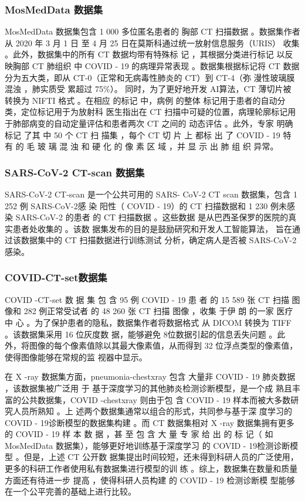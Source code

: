 \documentclass[journal,twoside,web]{ieeecolor}
\begin{document}
\subsubsection{MosMedData 数据集}
MosMedData 数据集包含 1 000 多位匿名患者的  胸部 CT 扫描数据 。数据集作者从 2020 年 3 月 1 日  至 4 月 25 日在莫斯科通过统一放射信息服务（URIS） 收集 。此外，数据集中的所有 CT 数据均带有特殊标  记 ，其根据分类进行标记 以反 映胸部 CT 肺组织 中  COVID - 19 的病理异常表现 。数据集根据标记将 CT  数据分为五大类，即从 CT-0（正常和无病毒性肺炎的  CT）到 CT-4（弥 漫性玻璃膜混浊 ，肺实质受 累超过
75\%）。 同时，为了更好地开发 AI算法，CT 薄切片被 转换为 NIFTI 格式 。在相应 的标记 中，病例 的整体 标记用于患者的自动分类，定位标记用于为放射科 医生指出在 CT 扫描中可疑的位置，病理轮廓标记用 于肺部病变的自动定量评估和患者两次 CT 之间的 动态评估 。此外，专家 明确标记 了其 中 50 个 CT 扫 描集 ，每个 CT 切 片 上 都标 出 了 COVID - 19 特 有 的 毛 玻 璃 混 浊 和 硬 化 的 像 素 区 域 ，并 显 示 出 肺 组 织 异常。
\subsubsection{SARS-CoV-2 CT-scan 数据集}
SARS-CoV-2 CT-scan 是一个公共可用的 SARS-  CoV-2 CT scan 数据集，包含 1 252 例 SARS-CoV-2感 染 阳性（ COVID - 19）的 CT 扫描数据和 1 230 例未感 染 SARS-CoV-2 的患者 的 CT 扫描数据 。这些数据 是从巴西圣保罗的医院的真实患者处收集的 。该数 据集发布的目的是鼓励研究和开发人工智能算法， 旨在通过该数据集中的 CT 扫描数据进行训练测试
分析，确定病人是否被 SARS-CoV-2感染。
\subsubsection{COVID-CT-set数据集}
COVID -CT-set 数 据 集 包 含 95 例 COVID - 19 患 者 的 15 589 张 CT 扫描 图像和 282 例正常受试者 的 48 260 张 CT 扫描 图像 ，收集 于伊 朗 的一家 医疗 中 心 。为了保护患者的隐私，数据集作者将数据格式 从 DICOM 转换为 TIFF 。该数据集采用 16 位灰度数 据，能够避免 8位数据引起的信息丢失问题 。此外，将图像的每个像素值除以其最大像素值，从而得到 32 位浮点类型的像素值，使得图像能够在常规的监 视器中显示。

在 X -ray 数据集方面，pneumonia-chestxray 包含 大量非 COVID - 19 肺炎数据 ，该数据集被广泛用 于 基于深度学习的其他肺炎检测诊断模型，是一个成 熟且丰富的公共数据集，COVID -chestxray 则由于包 含 COVID - 19 样本而被大多数研究人员所熟知 。上 述两个数据集通常以组合的形式，共同参与基于深 度学习的 COVID - 19诊断模型的数据集构建 。而 CT  数据集相对 X -ray 数据集拥有更多 的 COVID - 19 样 本 数 据 ，甚 至 包 含 大 量 专 家 给 出 的 标 记（ 如 MosMedData 数据集），能够更好地训练基于深度学习 的 COVID - 19检测诊断模型 。但是，上述 CT 公开数 据集提出时间较短，还未得到科研人员的广泛使用， 更多的科研工作者使用私有数据集进行模型的训 练 。综上，数据集在数量和质量方面还有待进一步 提高 ，使得科研人员构建 的 COVID - 19 检测诊断模 型能够在一个公平完善的基础上进行比较。
\end{document}
